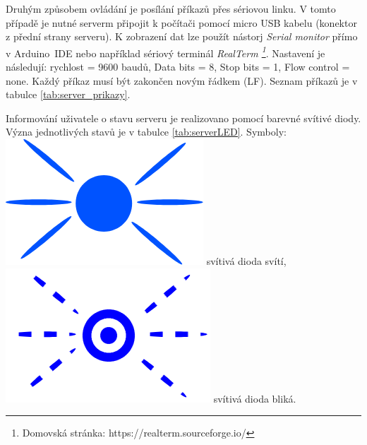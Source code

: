 Druhým způsobem ovládání je posílání příkazů přes sériovou linku. V tomto případě je nutné serverm připojit k počítači pomocí micro USB kabelu (konektor z přední strany serveru). K zobrazení dat lze použít nástorj \textit{Serial monitor} přímo v Arduino~IDE nebo například sériový terminál \textit{RealTerm \footnote{Domovská stránka: https://realterm.sourceforge.io/}}. Nastavení je následují: rychlost = 9600 baudů, Data bits = 8, Stop bits = 1, Flow control = none.  Každý příkaz musí být zakončen novým řádkem (LF). Seznam příkazů je v tabulce \ref{tab:server_prikazy}.

Informování uživatele o stavu serveru je realizovano pomocí barevné svítivé diody. Význa jednotlivých stavů je v tabulce \ref{tab:serverLED}. Symboly: \includegraphics[height=.4cm]{img/manual/blue.png} svítivá dioda svítí, \includegraphics[height=.4cm]{img/manual/blue_blink.png} svítivá dioda bliká.




